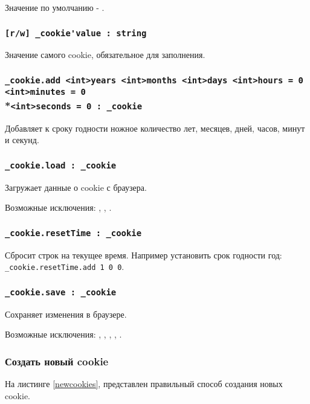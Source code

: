 Значение по умолчанию - \false.

\subsubsection{\lstinline|[r/w] _cookie'value : string|}

Значение самого cookie, обязательное для заполнения.

\subsubsection{\lstinline|_cookie.add <int>years <int>months <int>days <int>hours = 0 <int>minutes = 0|\\*\noindent\lstinline|<int>seconds = 0 : _cookie|}

Добавляет к сроку годности ножное количество лет, месяцев, дней, часов, минут и секунд.

\subsubsection{\lstinline|_cookie.load : _cookie|}

Загружает данные о cookie с браузера.

Возможные исключения: , , .

\subsubsection{\lstinline|_cookie.resetTime : _cookie|}

Сбросит строк на текущее время. Например установить срок годности год: \lstinline|_cookie.resetTime.add 1 0 0|.

\subsubsection{\lstinline|_cookie.save : _cookie|}

Сохраняет изменения в браузере.

Возможные исключения: , , , , .

\subsubsection{Создать новый cookie}

На листинге \ref{newcookies}, представлен правильный способ создания новых cookie.

